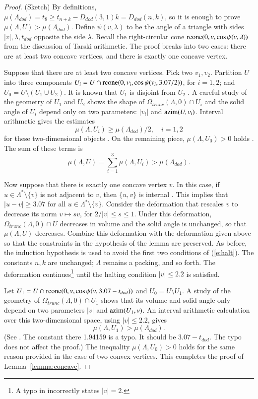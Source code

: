 \documentclass{article} %
\begin{document}
\begin{proof} (Sketch)  By definitions,
$\mu(\Lambda_{dod}) = t_8 \ge t_{n+k} - D_{dod}(3,1)k = D_{dod}(n,k)$, so it is
enough to prove $\mu(\Lambda,U) > \mu(\Lambda_{dod})$. 
Define $\psi(v,\lambda)$ to be the angle of a triangle with sides $|v|,\lambda,t_{dod}$
opposite the side $\lambda$.  Recall the right-circular cone 
${\operatorname{rcone}}(0,v,\cos\psi(v,\lambda))$ from the discussion of Tarski arithmetic.
The proof breaks into two
cases: there are at least two concave vertices, and there is exactly one concave vertex.

Suppose that there are at least two concave vertices.  Pick two $v_1,v_2$.
Partition $U$ into three
components $U_i = U\cap {\operatorname{rcone}}(0,v_i,\cos\psi(v_i,3.07/2))$, for $i=1,2$; and
$U_0= U\setminus (U_1\cup U_2)$.  It is known that
$U_1$ is disjoint from $U_2$ \cite[Lemma~3.7]{arx}.   A careful study of the geometry
of $U_1$ and $U_2$ shows the shape of $\Omega_{trunc}(\Lambda,0)\cap U_i$ and the
solid angle of $U_i$ depend only
on two parameters: $|v_i|$ and ${\operatorname{azim}}(U,v_i)$.  Interval arithmetic gives
the estimates
  $$\mu(\Lambda,U_i) \ge \mu(\Lambda_{dod})/2,\quad i=1,2$$
for these two-dimensional objects \cite[\S7.2.6]{arx}.  On the remaining piece, $\mu(\Lambda,U_0)>0$ holds
\cite[p.138]{DCG}.  The sum of these terms is
  $$
  \mu(\Lambda,U) = \sum_{i=1}^3 \mu(\Lambda,U_i) > \mu(\Lambda_{dod}).
  $$

Now suppose that there is exactly one concave vertex $v$.  In this case, if $u\in\Lambda^*\setminus\{v\}$
is not adjacent to $v$, then $\{u,v\}$ is internal \cite[p.140]{DCG}.  This implies
that $|u-v|\ge 3.07$ for all $u\in\Lambda^*\setminus\{v\}$.
Consider the deformation that rescales $v$ to decrease its norm $v\mapsto s v$, for 
$2/|v|\le s\le 1$. Under this deformation, $\Omega_{trunc}(\Lambda,0)\cap U$ decreases
in volume and the solid angle is unchanged, so that $\mu(\Lambda,U)$ decreases.
Combine this deformation with the deformation given above so that the
constraints in the hypothesis of the lemma are preserved.  As before, the induction
hypothesis is used to avoid the first two conditions of (\ref{e:halt}).
The constants $n,k$ are unchanged; $\Lambda$ remains a packing, and so forth.
The deformation continues\footnote{A typo in \cite{arx}  incorrectly states $|v|=2$.} until the halting condition $|v|\le 2.2$ is satisfied. 

Let $U_1 = U\cap {\operatorname{rcone}}(0,v,\cos\psi(v,3.07-t_{dod}))$ and $U_0 = U
\setminus U_1$.  A study of the geometry of $\Omega_{trunc}(\Lambda,0)
\cap U_1$ shows that its volume and solid angle only depend 
on two parameters $|v|$ and
${\operatorname{azim}}(U_1,v)$.  An interval arithmetic calculation over this
two-dimensional space, using $|v|\le 2.2$, gives
$$
\mu(\Lambda,U_1) > \mu(\Lambda_{dod}).
$$
(See \cite[\S7.2.6]{arx}. The constant there 1.94159 is a typo.
It should be $3.07-t_{dod}$.  The typo does not affect the proof.)
The inequality $\mu(\Lambda,U_0)>0$ holds for the same reason provided
in the case of two convex vertices.  This completes
the proof of Lemma~\ref{lemma:concave}.
\end{proof}
\end{document}
